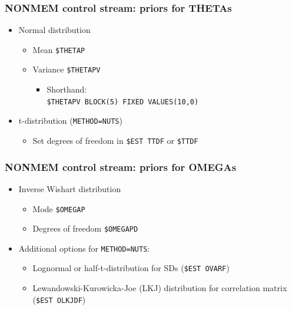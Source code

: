 \documentclass[handout]{beamer}
\begin{document}
\begin{frame}[fragile]
  \frametitle{NONMEM control stream: priors for THETAs}

\begin{itemize}
  \item Normal distribution
        \begin{itemize}
          \item Mean \verb|$THETAP|
          \item Variance \verb|$THETAPV|
                \begin{itemize}
                  \item Shorthand: \\
                        \verb|$THETAPV BLOCK(5) FIXED VALUES(10,0)|
                \end{itemize}
        \end{itemize}
  \item t-distribution (\verb|METHOD=NUTS|)
        \begin{itemize}
          \item Set degrees of freedom in \verb|$EST TTDF| or \verb|$TTDF|
        \end{itemize}
\end{itemize}

\end{frame}

\begin{frame}[fragile]
  \frametitle{NONMEM control stream: priors for OMEGAs}

\begin{itemize}
  \item Inverse Wishart distribution
  \begin{itemize}
    \item Mode \verb|$OMEGAP|
    \item Degrees of freedom \verb|$OMEGAPD|
  \end{itemize}
  \item Additional options for \verb|METHOD=NUTS|:
        \begin{itemize}
          \item Lognormal or half-t-distribution for SDs (\verb|$EST OVARF|)
          \item Lewandowski-Kurowicka-Joe (LKJ) distribution for correlation matrix (\verb|$EST OLKJDF|)
        \end{itemize}
\end{itemize}

\end{frame}
\end{document}
